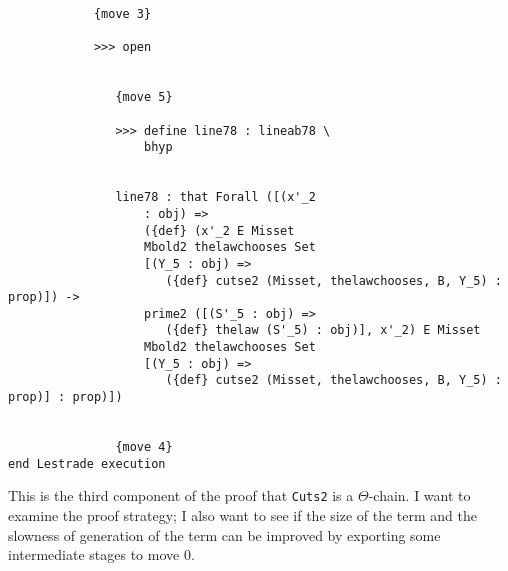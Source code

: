 \documentclass[12pt]{article}
\begin{document}
\begin{verbatim}
            {move 3}

            >>> open


               {move 5}

               >>> define line78 : lineab78 \
                   bhyp


               line78 : that Forall ([(x'_2 
                   : obj) => 
                   ({def} (x'_2 E Misset 
                   Mbold2 thelawchooses Set 
                   [(Y_5 : obj) => 
                      ({def} cutse2 (Misset, thelawchooses, B, Y_5) : prop)]) -> 
                   prime2 ([(S'_5 : obj) => 
                      ({def} thelaw (S'_5) : obj)], x'_2) E Misset 
                   Mbold2 thelawchooses Set 
                   [(Y_5 : obj) => 
                      ({def} cutse2 (Misset, thelawchooses, B, Y_5) : prop)] : prop)])


               {move 4}
end Lestrade execution
\end{verbatim}

This is the third component of the proof that {\tt Cuts2} is a $\Theta$-chain.  I want to examine the proof strategy;  I also want to see if the size of the term and the slowness of generation of the term can be improved by exporting some intermediate stages to move 0.
\end{document}
